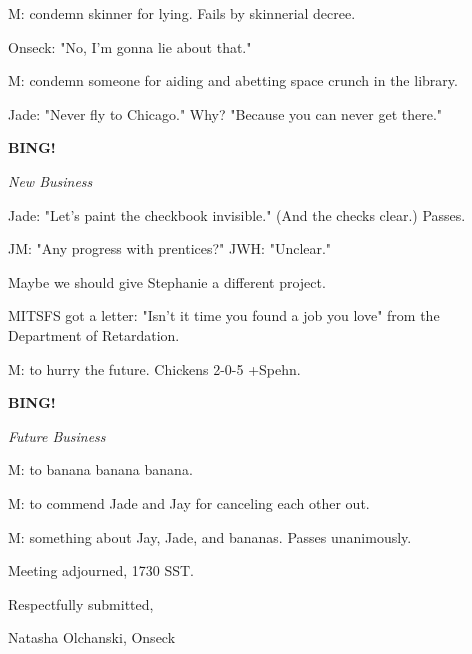 \documentclass[12pt]{article}
\newcommand{\bing}{{\bf BING!} }
\newcommand{\goto}[1]{\bing \vskip 12pt \centerline{{\em{#1}}}}
\begin{document}
M: condemn skinner for lying. Fails by skinnerial decree.

Onseck: "No, I'm gonna lie about that."

M: condemn someone for aiding and abetting space crunch in the library.

Jade: "Never fly to Chicago." Why? "Because you can never get there."

\goto{New Business}

Jade: "Let's paint the checkbook invisible." (And the checks clear.) Passes.

JM: "Any progress with prentices?" JWH: "Unclear."

Maybe we should give Stephanie a different project.

MITSFS got a letter: "Isn't it time you found a job you love" from the Department of Retardation.

M: to hurry the future. Chickens 2-0-5 +Spehn.

\goto{Future Business}

M: to banana banana banana.

M: to commend Jade and Jay for canceling each other out.

M: something about Jay, Jade, and bananas. Passes unanimously.

\vspace{12pt}

\noindent
Meeting adjourned, 1730 SST.

\vspace{18pt}

\centerline{Respectfully submitted,}
\centerline{Natasha Olchanski, Onseck}
\end{document}
